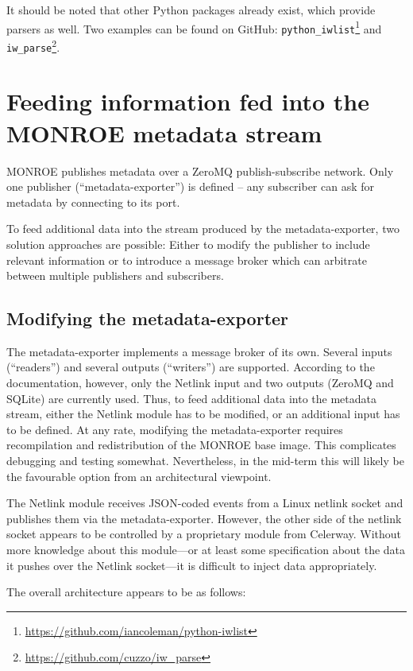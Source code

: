\documentclass{scrartcl}
\begin{document}
It should be noted that other Python packages already exist, which provide
parsers as well.  Two examples can be found on GitHub:
\verb#python_iwlist#\footnote{\url{https://github.com/iancoleman/python-iwlist}}
and
\verb#iw_parse#\footnote{\url{https://github.com/cuzzo/iw_parse}}.

\section*{Feeding information fed into the MONROE metadata stream}

MONROE publishes metadata over a ZeroMQ publish-subscribe network. Only one
publisher (``metadata-exporter'') is defined -- any subscriber can ask for
metadata by connecting to its port.

To feed additional data into the stream produced by the metadata-exporter,
two solution approaches are possible: Either to modify the publisher to include
relevant information or to introduce a message broker which can arbitrate
between multiple publishers and subscribers.

\subsection*{Modifying the metadata-exporter}

The metadata-exporter implements a message broker of its own. Several inputs
(``readers'') and several outputs (``writers'') are supported. According to the
documentation, however, only the Netlink input and two outputs (ZeroMQ and
SQLite) are currently used. Thus, to feed additional data into the metadata
stream, either the Netlink module has to be modified, or an additional input
has to be defined. At any rate, modifying the metadata-exporter requires
recompilation and redistribution of the MONROE base image. This complicates
debugging and testing somewhat. Nevertheless, in the mid-term this will likely
be the favourable option from an architectural viewpoint.

The Netlink module receives JSON-coded events from a Linux netlink socket and
publishes them via the metadata-exporter. However, the other side of the
netlink socket appears to be controlled by a proprietary module from Celerway.
Without more knowledge about this module---or at least some specification about
the data it pushes over the Netlink socket---it is difficult to inject data
appropriately.

The overall architecture appears to be as follows:
\end{document}
